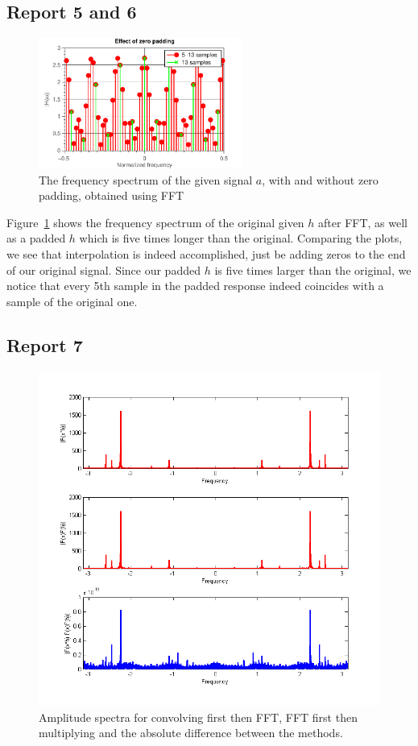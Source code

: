 \documentclass[11pt,titlepage]{report}
\begin{document}
\subsection{Report 5 and 6}

\begin{figure}[H]
	\centering
	\includegraphics[width=0.6\textwidth]{resource/ass-1-report-5-6.pdf}
	\caption{The frequency spectrum of the given signal $a$, with and without zero padding, obtained using FFT}
	\label{fig:rep5-6-spectrum}
\end{figure}

Figure~\ref{fig:rep5-6-spectrum} shows the frequency spectrum of the original given $h$ after FFT, as well as a padded $h$ which is five times longer than the original. Comparing the plots, we see that interpolation is indeed accomplished, just be adding zeros to the end of our original signal. Since our padded $h$ is five times larger than the original, we notice that every 5th sample in the padded response indeed coincides with a sample of the original one.

\subsection{Report 7}

\begin{figure}[H]
	\centering
	\includegraphics[width=0.8\linewidth]{resource/rep7.png}
	\caption{Amplitude spectra for convolving first then FFT, FFT first then multiplying and the absolute difference between the methods.}
	\label{fig:rep7}
\end{figure}
\end{document}
